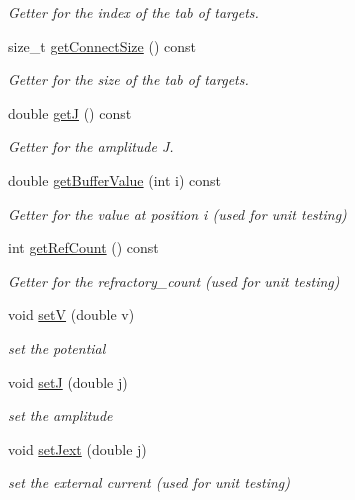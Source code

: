 \begin{DoxyCompactItemize}
\begin{DoxyCompactList}\small\item\em Getter for the index of the tab of targets. \end{DoxyCompactList}\item 
size\-\_\-t \hyperlink{classNeuron_a31d6fd5ff3351bb18e9f0e00115a0a14}{get\-Connect\-Size} () const 
\begin{DoxyCompactList}\small\item\em Getter for the size of the tab of targets. \end{DoxyCompactList}\item 
double \hyperlink{classNeuron_a320ab48e220523371b266385c650e31f}{get\-J} () const 
\begin{DoxyCompactList}\small\item\em Getter for the amplitude J. \end{DoxyCompactList}\item 
double \hyperlink{classNeuron_ae718bf1d1e5772dcef94301f73418cca}{get\-Buffer\-Value} (int i) const 
\begin{DoxyCompactList}\small\item\em Getter for the value at position i (used for unit testing) \end{DoxyCompactList}\item 
int \hyperlink{classNeuron_ac1c1ab9d1b0d0a05814b56e1f3f10ca4}{get\-Ref\-Count} () const 
\begin{DoxyCompactList}\small\item\em Getter for the refractory\-\_\-count (used for unit testing) \end{DoxyCompactList}\item 
void \hyperlink{classNeuron_abf35fc96817f39a5bdfe33540d2a137a}{set\-V} (double v)
\begin{DoxyCompactList}\small\item\em set the potential \end{DoxyCompactList}\item 
void \hyperlink{classNeuron_a475ad67c35d19e414abff5e973ef93f1}{set\-J} (double j)
\begin{DoxyCompactList}\small\item\em set the amplitude \end{DoxyCompactList}\item 
void \hyperlink{classNeuron_a04ceea00a45a58ce3204e431b0f3f894}{set\-Jext} (double j)
\begin{DoxyCompactList}\small\item\em set the external current (used for unit testing) \end{DoxyCompactList}\item 

\end{DoxyCompactItemize}
